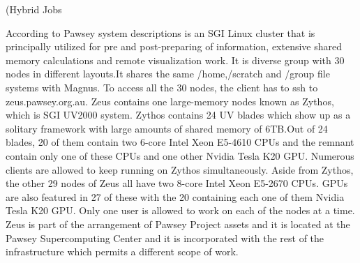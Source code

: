 \begin{Document}
{



\Subsubsection(Hybrid Jobs}



According to Pawsey system descriptions is an SGI Linux cluster that is principally utilized for pre and post-preparing of information, extensive shared memory calculations and remote visualization work.
It is diverse group with 30 nodes in different layouts.It shares the same /home,/scratch and /group file systems with Magnus. 
To access all the 30 nodes, the client has to ssh to zeus.pawsey.org.au.
Zeus contains one large-memory nodes known as Zythos, which is SGI UV2000 system. 
Zythos contains 24 UV blades which show up as a solitary framework with large amounts of shared memory of 6TB.Out of 24 blades, 20 of them contain two 6-core Intel Xeon E5-4610 CPUs and the remnant contain only one of these CPUs and one other Nvidia Tesla K20 GPU. 
Numerous clients are allowed to keep running on Zythos simultaneously.
Aside from Zythos, the other 29 nodes of Zeus all have two 8-core Intel Xeon E5-2670 CPUs. 
GPUs are also featured in 27 of these with the 20 containing each one of them Nvidia Tesla K20 GPU. 
Only one user is allowed to work on each of the nodes at a time.
Zeus is part of the arrangement of Pawsey Project assets and it is located at the Pawsey Supercomputing Center and it is incorporated with the rest of the infrastructure which permits a different scope of work.
 

















































\end{Document}
